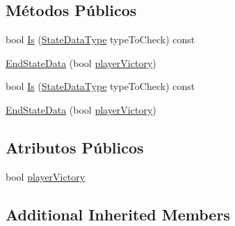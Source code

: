 \subsection*{Métodos Públicos}
\begin{DoxyCompactItemize}
\item 
bool \hyperlink{classEndStateData_abce01a73395040307914a4aa62741463}{Is} (\hyperlink{StateData_8h_a11e85d0fc3db733c13a8d9d030471c7d}{State\+Data\+Type} type\+To\+Check) const 
\item 
\hyperlink{classEndStateData_a3193e460f24f5cbd1098030864c75ddc}{End\+State\+Data} (bool \hyperlink{classEndStateData_aa26994b44ccac743a141c9709c526302}{player\+Victory})
\item 
bool \hyperlink{classEndStateData_abce01a73395040307914a4aa62741463}{Is} (\hyperlink{StateData_8h_a11e85d0fc3db733c13a8d9d030471c7d}{State\+Data\+Type} type\+To\+Check) const 
\item 
\hyperlink{classEndStateData_a3193e460f24f5cbd1098030864c75ddc}{End\+State\+Data} (bool \hyperlink{classEndStateData_aa26994b44ccac743a141c9709c526302}{player\+Victory})
\end{DoxyCompactItemize}
\subsection*{Atributos Públicos}
\begin{DoxyCompactItemize}
\item 
bool \hyperlink{classEndStateData_aa26994b44ccac743a141c9709c526302}{player\+Victory}
\end{DoxyCompactItemize}
\subsection*{Additional Inherited Members}


